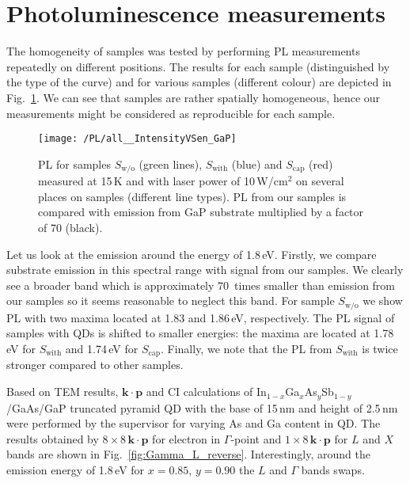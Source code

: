 \section{Photoluminescence measurements}

The homogeneity of samples was tested by performing PL measurements repeatedly on different positions. The results for each sample (distinguished by the type of the curve) and for various samples (different colour) are depicted in Fig.~\ref{fig:PL_homogenity}. We can see that samples are rather spatially homogeneous, hence our measurements might be considered as reproducible for each sample. %


\begin{figure}
	\centering
	\texttt{[image: /PL/all\_\_IntensityVSen\_GaP]}
	\caption{PL for samples $S_\mathrm{w/o}$ (green lines), $S_\mathrm{with}$ (blue) and $S_\mathrm{cap}$ (red) measured at 15$\,$K and with laser power of 10$\,$W/cm$^2$ on several places on samples (different line types). PL from our samples is compared with emission from GaP substrate multiplied by a factor of 70 (black).}
	\label{fig:PL_homogenity}
\end{figure}

Let us look at the emission around the energy of 1.8$\,$eV. Firstly, we compare substrate emission in this spectral range with signal from our samples. We clearly see a broader band which is approximately 70~times smaller than emission from our samples so it seems reasonable to neglect this band. For sample $S_\mathrm{w/o}$ we show PL with two maxima located at 1.83 and 1.86$\,$eV, respectively. The PL signal of samples with QDs is shifted to smaller energies: the maxima are located at 1.78$\,$eV for $S_\mathrm{with}$ and 1.74$\,$eV for $S_\mathrm{cap}$. Finally, we note that the PL from $S_\mathrm{with}$ is twice stronger compared to other samples.


 
Based on TEM results, $\mathbf{k \cdot p}$ and CI calculations of In$_{1-x}$Ga$_{x}$As$_y$Sb$_{1-y}$/GaAs/GaP truncated pyramid QD with the base of 15$\,$nm and height of 2.5$\,$nm were performed by the supervisor for varying As and Ga content in QD. The results obtained by $8\times 8\,\mathbf{k \cdot p}$ for electron in $\Gamma$-point and $1\times 8\,\mathbf{k \cdot p}$ for $L$ and $X$ bands are shown in Fig.~\ref{fig:Gamma_L_reverse}. Interestingly, around the emission energy of 1.8$\,$eV for $x=0.85$, $y=0.90$ the $L$ and $\Gamma$ bands swaps.
		

